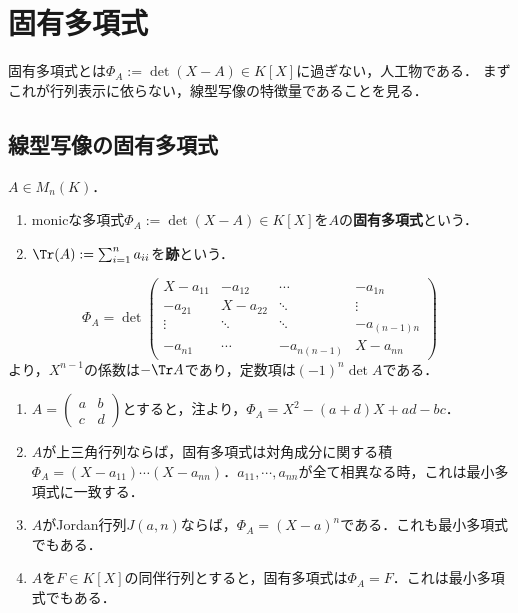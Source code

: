 \documentclass[uplatex, dvipdfmx]{jsreport}
\begin{document}
\section{固有多項式}

\begin{tcolorbox}[colframe=ForestGreen, colback=ForestGreen!10!white, breakable]
    固有多項式とは$\Phi_A:=\det(X-A)\in K[X]$に過ぎない，人工物である．
    まずこれが行列表示に依らない，線型写像の特徴量であることを見る．
\end{tcolorbox}

\subsection{線型写像の固有多項式}

\begin{definition}
    $A\in M_n(K)$．
    \begin{enumerate}
        \item monicな多項式$\Phi_A:=\det(X-A)\in K[X]$を$A$の\textbf{固有多項式}という．
        \item $\Tr(A):=\sum^n_{i=1}a_{ii}$を\textbf{跡}という．
    \end{enumerate}
\end{definition}

\begin{remark}
    \[ \Phi_A=\det\begin{pmatrix}X-a_{11}&-a_{12}&\cdots&-a_{1n}\\-a_{21}&X-a_{22}&\ddots&\vdots\\\vdots&\ddots&\ddots&-a_{(n-1)n}\\-a_{n1}&\cdots&-a_{n(n-1)}&X-a_{nn}\end{pmatrix} \]
    より，$X^{n-1}$の係数は$-\Tr A$であり，定数項は$(-1)^n\det A$である．
\end{remark}

\begin{example}\mbox{}\label{example-eigenpolynomial}
    \begin{enumerate}
        \item $A=\begin{pmatrix}a&b\\c&d\end{pmatrix}$とすると，注より，$\Phi_A=X^2-(a+d)X+ad-bc$．
        \item $A$が上三角行列ならば，固有多項式は対角成分に関する積$\Phi_A=(X-a_{11})\cdots(X-a_{nn})$．$a_{11},\cdots,a_{nn}$が全て相異なる時，これは最小多項式に一致する．
        \item $A$がJordan行列$J(a,n)$ならば，$\Phi_A=(X-a)^n$である．これも最小多項式でもある．
        \item $A$を$F\in K[X]$の同伴行列とすると，固有多項式は$\Phi_A=F$．これは最小多項式でもある．
    \end{enumerate}
\end{example}
\end{document}
